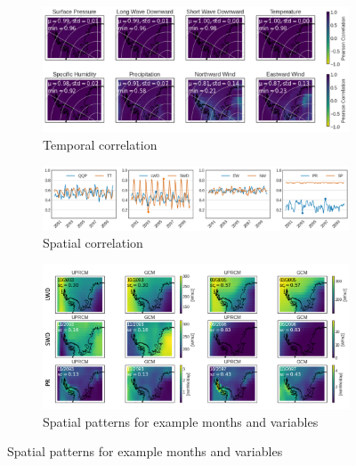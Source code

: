 \documentclass[a4paper,11pt,oneside]{report}
\begin{document}
\begin{figure}[tbp]
        \centering
        \begin{subfigure}[b]{\columnwidth}
            \centering \includegraphics[width=\textwidth]{doc/Thesis-latex/images/results/temporalCorr_RCM_GCM.pdf}
            \caption[]%
            {{\small Temporal correlation}}    
          \label{fig:temp-corr-GCM-UPRCM}
        \end{subfigure}
        \hfill
            \begin{subfigure}[b]{\columnwidth}
            \centering \includegraphics[width=\textwidth]{doc/Thesis-latex/images/results/spatialCorr_TS_RCM_GCM.pdf}
            \caption[]%
            {{\small Spatial correlation}}    
          \label{fig:spatial-corr-GCM-UPRCM}
        \end{subfigure}
        \hfill
        \begin{subfigure}[b]{\columnwidth}  
            \centering 
            \includegraphics[width=\textwidth]{doc/Thesis-latex/images/results/spatialCorr_RCM_GCM.pdf}
            \caption[]%
            {{\small Spatial patterns for example months and variables}} \label{fig:spatial-corr-GCM-RCM-ex}

\end{subfigure}
\end{figure}
\end{document}
